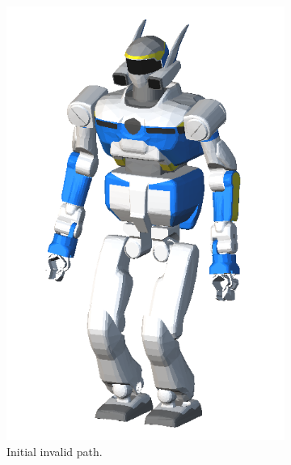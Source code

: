 \begin{figure}
  \centering
  \begin{subfigure}{0.48\columnwidth}
    \centering
    \includegraphics[width = \columnwidth]
                    {src/chap3-optimal-motion-planning/figure/hrp2-full-mesh.png}
    \caption{Initial invalid path.}
    \label{simple-patha}
  \end{subfigure}
  \begin{subfigure}{0.48\columnwidth}
    \centering

\end{subfigure}
\end{figure}
